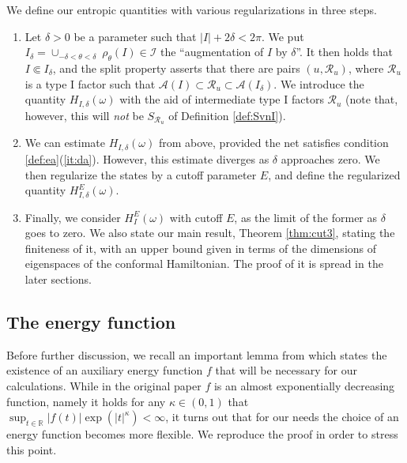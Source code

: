 \documentclass[a4paper,12pt]{article}
\theoremstyle{plain}
\theoremstyle{definition}
\theoremstyle{remark}
\def\A{{\mathcal A}}
\def\R{{\mathcal R}}
\def\R{{\mathcal R}}
\begin{document}
We define our entropic quantities with various regularizations in three steps.
\begin{enumerate}[(1)]
\item Let $\delta>0$ be a parameter such that $|I| + 2\delta < 2\pi$.
We put $I_\delta = \cup_{-\delta < \theta <\delta}\;\rho_\theta(I) \in \mathcal{I}$ the ``augmentation of $I$ by $\delta$''.
It then holds that $I \Subset I_\delta$, and the split property asserts that there are pairs $(u,\R_u)$, where $\R_u$ is a type I factor
such that $\A(I) \subset \R_u \subset \A(I_\delta)$. We introduce the quantity $H_{I,\delta}(\omega)$ with the aid of intermediate type I factors $\R_u$ (note that, however, this will \emph{not} be $S_{\R_u}$ of Definition \ref{def:SvnI}).
\item We can estimate $H_{I,\delta}(\omega)$ from above, provided the net satisfies condition \ref{def:ea}(\ref{it:da}). However, this estimate diverges as $\delta$ approaches zero.
We then regularize the states by a cutoff parameter $E$, and define the regularized quantity $H^E_{I,\delta}(\omega)$.
\item Finally, we consider $H_I^E(\omega)$ with cutoff $E$, as the limit of the former as $\delta$ goes to zero.
We also state our main result, Theorem \ref{thm:cut3}, stating the finiteness of it, with an upper bound given in terms of the dimensions of eigenspaces of the conformal Hamiltonian.
The proof of it is spread in the later sections.
\end{enumerate}


\subsection{The energy function}

Before further discussion, we recall an important lemma from
\cite{bdf87} which states the existence of an auxiliary energy
function $f$ that will be necessary for our calculations.  While in
the original paper $f$ is an almost exponentially decreasing function,
namely it holds for any $\kappa \in (0,1)$ that $\sup_{t\in\mathbb{R}}
\left| f(t)\right| \exp(|t|^\kappa)< \infty$, it turns out that for
our needs the choice of an energy function becomes more flexible. We
reproduce the proof in order to stress this point.
\end{document}
